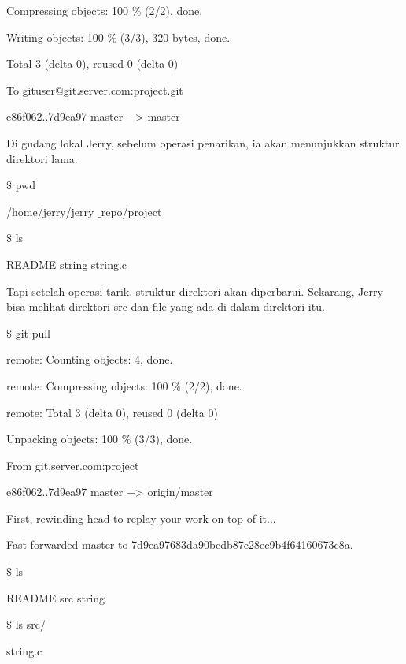\noindent 
Compressing objects: 100 $  \%  $ (2/2), done. \par
\noindent 
Writing objects: 100 $  \%  $ (3/3), 320 bytes, done. \par
\noindent 
Total 3 (delta 0), reused 0 (delta 0) \par
\noindent 
To gituser@git.server.com:project.git \par
\noindent 
e86f062..7d9ea97 master  $ - $> master \par
\vspace{12pt}
\vspace{12pt}
\noindent 
 \hspace*{0.5in} Di gudang lokal Jerry, sebelum operasi penarikan, ia akan menunjukkan struktur direktori lama. \par
\vspace{12pt}
 $  \$  $ pwd \par
\noindent 
/home/jerry/jerry $  \_  $repo/project \par
\vspace{12pt}
 $  \$  $ ls \par
\noindent 
README string string.c \par
\vspace{12pt}
\noindent 
 \hspace*{0.5in} Tapi setelah operasi tarik, struktur direktori akan diperbarui. Sekarang, Jerry bisa melihat direktori src dan file yang ada di dalam direktori itu. \par
{} $  \$  $ git pull \par
\noindent 
remote: Counting objects: 4, done. \par
\noindent 
remote: Compressing objects: 100 $  \%  $ (2/2), done. \par
\noindent 
remote: Total 3 (delta 0), reused 0 (delta 0) \par
\noindent 
Unpacking objects: 100 $  \%  $ (3/3), done. \par
\noindent 
From git.server.com:project \par
\noindent 
e86f062..7d9ea97 master  $ - $> origin/master \par
\noindent 
First, rewinding head to replay your work on top of it... \par
\noindent 
Fast-forwarded master to 7d9ea97683da90bcdb87c28ec9b4f64160673c8a. \par
\vspace{12pt}
 $  \$  $ ls \par
\noindent 
README src string \par
\vspace{12pt}
 $  \$  $ ls src/ \par
\noindent 
string.c \par
\vspace{12pt}
\noindent 
